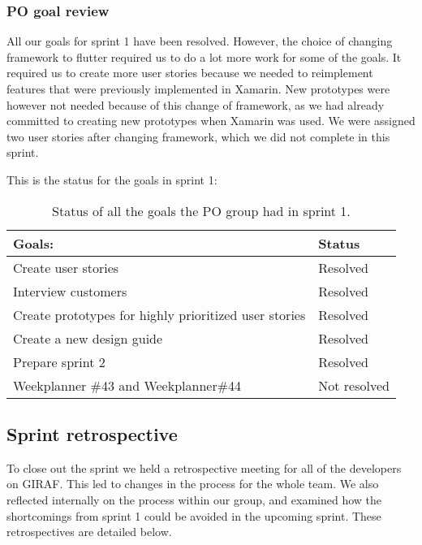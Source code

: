 \subsubsection{PO goal review}
All our goals for sprint 1 have been resolved. 
However, the choice of changing framework to flutter required us to do a lot more work for some of the goals.
It required us to create more user stories because we needed to reimplement features that were previously implemented in Xamarin.
New prototypes were however not needed because of this change of framework, as we had already committed to creating new prototypes when Xamarin was used.
We were assigned two user stories after changing framework, which we did not complete in this sprint.

\noindent
This is the status for the goals in sprint 1:
\begin{table}[H]
    \centering
    \begin{tabular}{|l|l|}
    \hline
    Goals:                                 & Status   \\ \hline
    Create user stories                    & Resolved \\ \hline
    Interview customers                    & Resolved \\ \hline
    Create prototypes for highly prioritized user stories & Resolved \\ \hline
    Create a new design guide                & Resolved \\ \hline
    Prepare sprint 2                       & Resolved \\ \hline
    Weekplanner \#43 and Weekplanner\#44                       & Not resolved \\ \hline
    \end{tabular}
    \caption{Status of all the goals the PO group had in sprint 1.}
    \label{PO-goal-review-sprint-1}
\end{table}

\subsection{Sprint retrospective}
To close out the sprint we held a retrospective meeting for all of the developers on GIRAF.
This led to changes in the process for the whole team.
We also reflected internally on the process within our group, and examined how the shortcomings from sprint 1 could be avoided in the upcoming sprint.
These retrospectives are detailed below.

